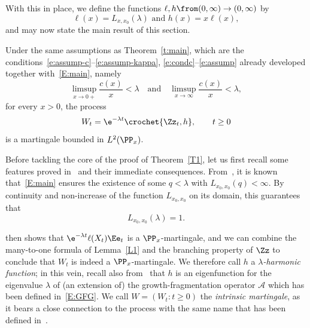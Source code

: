 With this in place, we define the functions $\ell, h \from (0,\infty) \to (0,\infty)$ by
\[
\ell(x) = L_{x, x_0}(\lambda) \text{ and } h(x) = x \ell(x),
\]
and may now state the main result of this section.

\begin{theo}\label{T1}
Under the same assumptions as Theorem~\ref{t:main}, which are the conditions~\eqref{e:assump-c}--\eqref{e:assump-kappa}, \eqref{e:condc}--\eqref{e:assump} already developed together with~\eqref{E:main}, namely
\begin{equation*}
\limsup _{x\to 0+} \frac{c(x)}{x}< \lambda \quad\text{and}\quad \limsup _{x\to \infty} \frac{c(x)}{x}<\lambda,
\end{equation*}
for every $x>0$, the process
\[
W_t = \e^{-\lambda t} \crochet{\Zz_t, h}, \qquad t\geq 0
\]
is a martingale bounded in $L^2(\PP_x)$.
\end{theo}

Before tackling the core of the proof of Theorem~\ref{T1}, let us first recall some features proved in~\cite{BW,BeFK} and their immediate consequences. From~\cite[Section~3.5]{BeFK}, it is known that~\eqref{E:main} ensures the existence of some $q<\lambda$ with $L_{x_0,x_0}(q)<\infty$. By continuity and non-increase of the function $L_{x_0,x_0}$ on its domain, this guarantees that
\begin{equation}\label{e:assump:malthus}
L_{x_0, x_0}(\lambda)=1.
\end{equation}


\label{s:mart}
\cite[Theorem~4.4]{BW} then shows that $\e^{-\lambda t} \ell(X_t) \Ee_t$ is a $\PP_{x}$-martingale, and we can combine the many-to-one formula of Lemma~\ref{L1} and the branching property of $\Zz$ to conclude that $W_t$ is indeed a $\PP_x$-martingale. We therefore call $h$ a \emph{$\lambda$-harmonic function}; in this vein, recall also from~\cite[Corollary~4.5 and Lemma~4.6]{BW} that $h$ is an eigenfunction for the eigenvalue $\lambda$ of (an extension of) the growth-fragmentation operator ${\mathcal A}$ which has been defined in~\eqref{E:GFG}. We call $W=(W_t: t\geq 0)$ the \emph{intrinsic martingale}, as it bears a close connection to the process with the same name that has been defined in~\cite[Section~5]{Jagers}.


